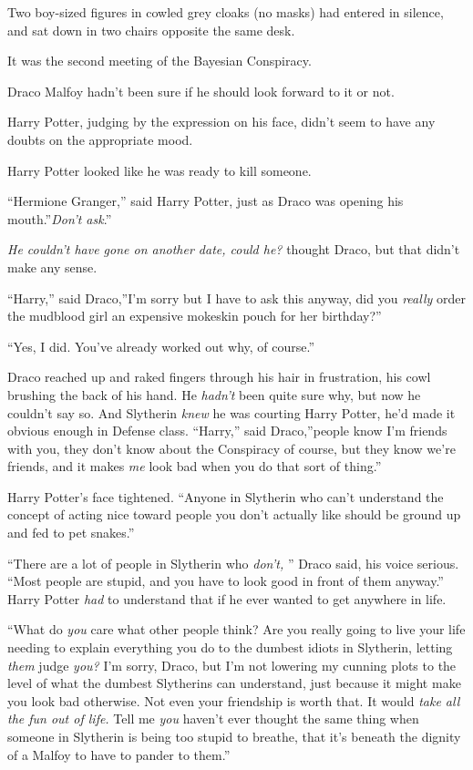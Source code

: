 Two boy-sized figures in cowled grey cloaks (no masks) had entered in
silence, and sat down in two chairs opposite the same desk.

It was the second meeting of the Bayesian Conspiracy.

Draco Malfoy hadn't been sure if he should look forward to it or not.

Harry Potter, judging by the expression on his face, didn't seem to have
any doubts on the appropriate mood.

Harry Potter looked like he was ready to kill someone.

``Hermione Granger,'' said Harry Potter, just as Draco was opening his
mouth.''\emph{Don't ask}.''

\emph{He couldn't have gone on another date, could he?} thought Draco,
but that didn't make any sense.

``Harry,'' said Draco,''I'm sorry but I have to ask this anyway, did you
\emph{really} order the mudblood girl an expensive mokeskin pouch for
her birthday?''

``Yes, I did. You've already worked out why, of course.''

Draco reached up and raked fingers through his hair in frustration, his
cowl brushing the back of his hand. He \emph{hadn't} been quite sure
why, but now he couldn't say so. And Slytherin \emph{knew} he was
courting Harry Potter, he'd made it obvious enough in Defense class.
``Harry,'' said Draco,''people know I'm friends with you, they don't
know about the Conspiracy of course, but they know we're friends, and it
makes \emph{me} look bad when you do that sort of thing.''

Harry Potter's face tightened. ``Anyone in Slytherin who can't
understand the concept of acting nice toward people you don't actually
like should be ground up and fed to pet snakes.''

``There are a lot of people in Slytherin who \emph{don't,} '' Draco said,
his voice serious. ``Most people are stupid, and you have to look good
in front of them anyway.'' Harry Potter \emph{had} to understand that if
he ever wanted to get anywhere in life.

``What do \emph{you} care what other people think? Are you really going
to live your life needing to explain everything you do to the dumbest
idiots in Slytherin, letting \emph{them} judge \emph{you?} I'm sorry,
Draco, but I'm not lowering my cunning plots to the level of what the
dumbest Slytherins can understand, just because it might make you look
bad otherwise. Not even your friendship is worth that. It would
\emph{take all the fun out of life.} Tell me \emph{you} haven't ever
thought the same thing when someone in Slytherin is being too stupid to
breathe, that it's beneath the dignity of a Malfoy to have to pander to
them.''

